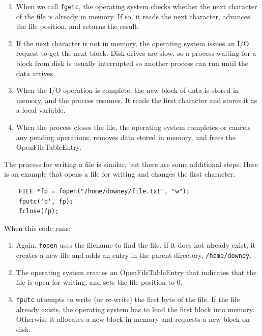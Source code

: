 \documentclass[12pt]{book}
\begin{document}
{\begin{enumerate}
\item When we call {\tt fgetc}, the operating system checks whether
  the next character of the file is already in memory.  If so, it
  reads the next character, advances the file position, and returns
  the result.

\item If the next character is not in memory, the operating
  system issues an I/O request to get the next block.  Disk drives are
  slow, so a process waiting for a block from disk is usually
  interrupted so another process can run until the data arrives.

\item When the I/O operation is complete, the new block of data is
  stored in memory, and the process resumes.  It reads the first
  character and stores it as a local variable.

\item When the process closes the file, the operating system completes
  or cancels any pending operations, removes data stored in
  memory, and frees the OpenFileTableEntry.

\end{enumerate}

The process for writing a file is similar, but there are some
additional steps.  Here is an example that opens a file for
writing and changes the first character.

\begin{verbatim}
    FILE *fp = fopen("/home/downey/file.txt", "w");
    fputc('b', fp);
    fclose(fp);
\end{verbatim}

When this code runs:

\begin{enumerate}

\item Again, {\tt fopen} uses the filename to find the file.  If it
  does not already exist, it creates a new file and adds an entry in
  the parent directory, {\tt /home/downey}.

\item The operating system creates an OpenFileTableEntry that
  indicates that the file is open for writing, and sets the file
  position to 0.

\item {\tt fputc} attempts to write (or re-write) the first byte of
  the file.  If the file already exists, the operating system has to
  load the first block into memory.  Otherwise it allocates a new
  block in memory and requests a new block on disk.


\end{enumerate}}
\end{document}
